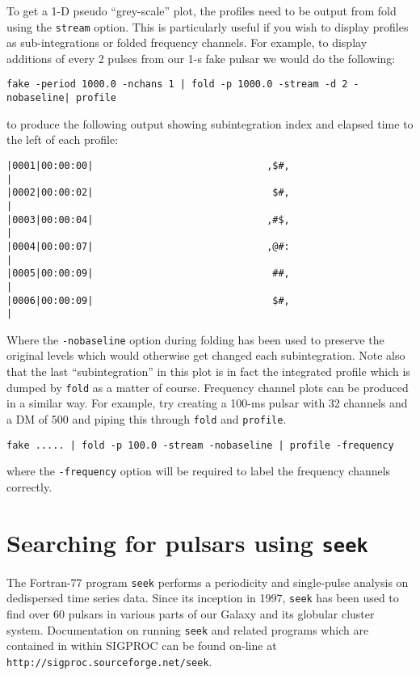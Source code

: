 \documentclass[11pt]{article}
\begin{document}
To get a 1-D pseudo ``grey-scale'' plot, the profiles need
to be output from fold using the {\tt stream} option. This is
particularly useful if you wish to display profiles as sub-integrations
or folded frequency channels. For example, to display additions of
every 2 pulses from our 1-s fake pulsar we would do the following:
\begin{verbatim}
fake -period 1000.0 -nchans 1 | fold -p 1000.0 -stream -d 2 -nobaseline| profile
\end{verbatim}
to produce the following output showing subintegration index and
elapsed time to the left of each profile:
\begin{verbatim}
|0001|00:00:00|                              ,$#,                              |
|0002|00:00:02|                               $#,                              |
|0003|00:00:04|                              ,#$,                              |
|0004|00:00:07|                              ,@#:                              |
|0005|00:00:09|                               ##,                              |
|0006|00:00:09|                               $#,                              |
\end{verbatim}
Where the {\tt -nobaseline} option during folding has been used to 
preserve the original levels which would otherwise get changed each
subintegration. Note also that the last ``subintegration'' in this
plot is in fact the integrated profile which is dumped by {\tt fold}
as a matter of course. Frequency channel plots can be produced in a 
similar way. For example, try creating a 100-ms pulsar with 32 channels
and a DM of 500 and piping this through {\tt fold} and {\tt profile}.
\begin{verbatim}
fake ..... | fold -p 100.0 -stream -nobaseline | profile -frequency
\end{verbatim}
where the {\tt -frequency} option will be required to label
the frequency channels correctly.

\section{Searching for pulsars using {\tt seek}}

The Fortran-77 program {\tt seek} performs a periodicity and single-pulse
analysis on dedispersed time series data. Since its inception in 1997,
{\tt seek} has been used to find over 60 pulsars in various parts of
our Galaxy and its globular cluster system. Documentation on running
{\tt seek} and related programs which are contained in within SIGPROC
can be found on-line at \verb+http://sigproc.sourceforge.net/seek+.
\end{document}
